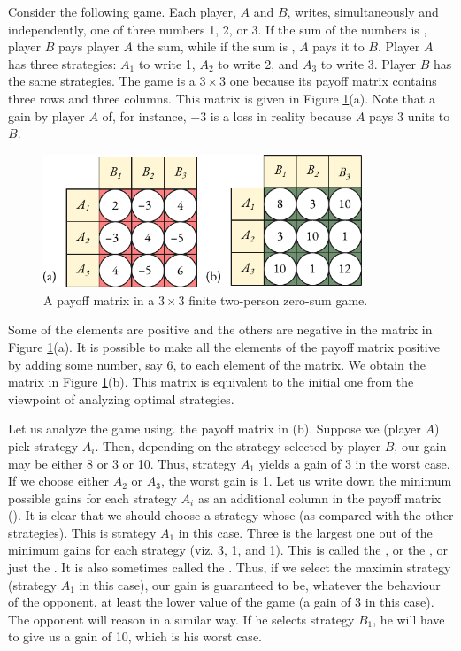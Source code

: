 Consider the following game. Each player, $A$ and $B$, writes, simultaneously
and independently, one of three numbers 1, 2, or 3. If the sum of
the numbers is , player $B$ pays player $A$ the sum, while if the sum is , $A$ pays it to $B$. Player $A$ has three strategies: $A_{1}$ to write 1, $A_{2}$ to write 2, and $A_{3}$ to write 3. Player $B$ has the same strategies. The game is a $3 \times 3$ one because its payoff matrix contains three rows and three columns. This matrix is given in Figure \ref{twoplayer2}(a). Note that a gain by player $A$ of, for instance, $-3$ is a loss in reality because $A$ pays 3 units to $B$. 

 \begin{figure}[!h]
 \centering
 \includegraphics[width=0.85\textwidth]{figures/two-player2.pdf}
\caption{A payoff matrix in a $3 \times 3$ finite two-person zero-sum game.\label{twoplayer2}}
 \end{figure}


Some of the elements are positive and the others are negative in the matrix in Figure \ref{twoplayer2}(a). It is possible to make all the elements of the payoff matrix positive by adding some number, say 6, to each element of the
matrix. We obtain the matrix in Figure \ref{twoplayer2}(b). This matrix is equivalent to the initial one from the viewpoint of analyzing optimal strategies.

 Let us analyze the game using. the payoff
matrix in (b). Suppose we (player $A$) pick strategy $A_{i}$. Then, depending on the strategy selected by player $B$, our gain may be either 8 or 3 or 10. Thus, strategy $A_{1}$ yields a gain of 3 in the worst case. If we choose either $A_{2}$ or $A_{3}$, the worst gain is 1. Let us write down the
minimum possible gains for each strategy $A_{i}$ as an additional column in
the payoff matrix (). It is clear that we should choose a strategy whose  (as compared with the other strategies). This is strategy $A_{1}$ in this case. Three is the largest one out of the minimum gains for each strategy (viz. 3, 1, and 1). This is called
the , or the , or just the . It is also sometimes called the . Thus, if we select the maximin strategy (strategy $A_{1}$ in this case), our gain is guaranteed to be, whatever the behaviour of the opponent, at least the lower value of the game (a gain of 3 in this case). The opponent will reason in a similar way. If he selects
strategy $B_{1}$, he will have to give us a gain of 10, which is his worst case.


